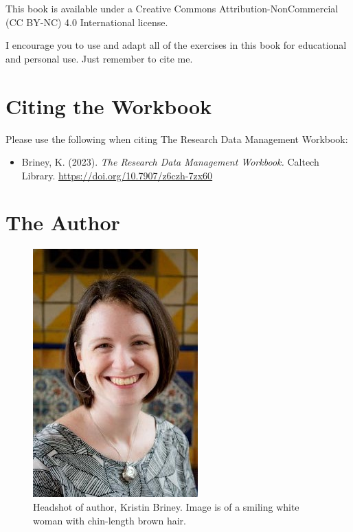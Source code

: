 \documentclass[
]{book}
\providecommand{\tightlist}{%
  \setlength{\itemsep}{0pt}\setlength{\parskip}{0pt}}
\begin{document}
This book is available under a Creative Commons Attribution-NonCommercial (CC BY-NC) 4.0 International license.

I encourage you to use and adapt all of the exercises in this book for educational and personal use. Just remember to cite me.

\hypertarget{citing-the-workbook}{%
\section*{Citing the Workbook}\label{citing-the-workbook}}

Please use the following when citing The Research Data Management Workbook:

\begin{itemize}
\tightlist
\item
  Briney, K. (2023). \emph{The Research Data Management Workbook.} Caltech Library. \url{https://doi.org/10.7907/z6czh-7zx60}
\end{itemize}

\hypertarget{the-author}{%
\section*{The Author}\label{the-author}}

\begin{figure}
\centering
\includegraphics{images/00_KristinBriney.jpg}
\caption{Headshot of author, Kristin Briney. Image is of a smiling white woman with chin-length brown hair.}
\end{figure}
\end{document}
